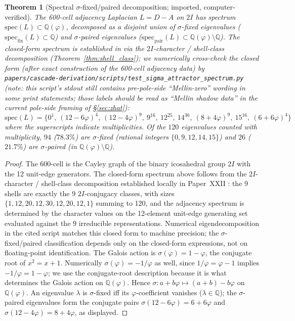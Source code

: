\documentclass[11pt, a4paper]{amsart}
\newtheorem{theorem}{Theorem}[section]
\theoremstyle{definition}
\newcommand{\Q}{\mathbb{Q}}
\begin{document}
\begin{theorem}[Spectral $\sigma$-fixed/paired decomposition; imported, computer-verified]\label{thm:spectral_attractor}
The 600-cell adjacency Laplacian $L = D - A$ on $2I$ has
spectrum $\mathrm{spec}(L) \subset \mathbb{Q}(\varphi)$, decomposed
as a disjoint union of $\sigma$-fixed eigenvalues
($\mathrm{spec}_{\mathrm{fix}}(L) \subset \mathbb{Q}$) and
$\sigma$-paired eigenvalues
($\mathrm{spec}_{\mathrm{pair}}(L) \subset \mathbb{Q}(\varphi)
\setminus \mathbb{Q}$).  The closed-form spectrum is established
in \cite[spectrum table at lines 177--193]{PaperXXII} via the
$2I$-character / shell-class decomposition
(Theorem~\ref{thm:shell_class}); we numerically cross-check the
closed form (after exact construction of the 600-cell adjacency
data) by
\texttt{papers/cascade-derivation/scripts/test\_sigma\_attractor\_spectrum.py}
(note: this script's stdout still contains pre-pole-side
``Mellin-zero'' wording in some print statements; those labels
should be read as ``Mellin shadow data'' in the current pole-side
framing of \S\ref{sec:zhat}):
\begin{equation*}
\mathrm{spec}(L) = \{0^{1},\ (12{-}6\varphi)^{4},\
(12{-}4\varphi)^{9},\ 9^{16},\ 12^{25},\ 14^{36},\
(8{+}4\varphi)^{9},\ 15^{16},\ (6{+}6\varphi)^{4}\}
\end{equation*}
where the superscripts indicate multiplicities.  Of the $120$
eigenvalues counted with multiplicity, $94$ ($78.3\%$) are
$\sigma$-fixed (rational integers $\{0, 9, 12, 14, 15\}$) and $26$
($21.7\%$) are $\sigma$-paired (in $\mathbb{Q}(\varphi)\setminus
\mathbb{Q}$).
\end{theorem}

\begin{proof}
The 600-cell is the Cayley graph of the binary icosahedral group
$2I$ with the 12 unit-edge generators.  The closed-form spectrum
above follows from the $2I$-character / shell-class decomposition
established locally in Paper~XXII
\cite[shell-class theorems, lines 175--223]{PaperXXII}:
the 9 shells are exactly the 9 $2I$-conjugacy classes, with sizes
$\{1,12,20,12,30,12,20,12,1\}$ summing to 120, and the adjacency
spectrum is determined by the character values on the 12-element
unit-edge generating set evaluated against the 9 irreducible
representations.  Numerical eigendecomposition in the cited script
matches this closed form to machine precision; the
$\sigma$-fixed/paired classification depends only on the
closed-form expressions, not on floating-point identification.
The Galois action is $\sigma(\varphi) = 1 - \varphi$, the
conjugate root of $x^2 = x + 1$.  Numerically
$\sigma(\varphi) = -1/\varphi$ as well, since
$1/\varphi = \varphi - 1$ implies
$-1/\varphi = 1 - \varphi$; we use the conjugate-root description
because it is what determines the Galois action on $\Q(\varphi)$.
Hence $\sigma: a + b\varphi \mapsto (a + b) - b\varphi$ on
$\Q(\varphi)$.  An eigenvalue $\lambda$ is $\sigma$-fixed iff its
$\varphi$-coefficient vanishes ($\lambda \in \Q$); the
$\sigma$-paired eigenvalues form the conjugate pairs
$\sigma(12 - 6\varphi) = 6 + 6\varphi$ and
$\sigma(12 - 4\varphi) = 8 + 4\varphi$, as displayed.
\end{proof}
\end{document}
